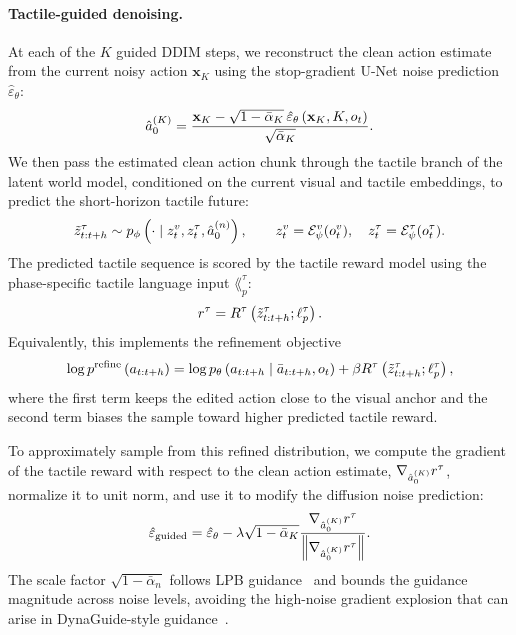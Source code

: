 \paragraph{Tactile-guided denoising.}
At each of the $K$ guided DDIM steps, we reconstruct the clean action estimate
from the current noisy action $\mathbf{x}_{K}$ using the stop-gradient U-Net
noise prediction $\hat{\varepsilon}_\theta$:
\begin{equation}
\hat{a}_{0}^{(K)}
=
\frac{
    \mathbf{x}_{K}
    -
    \sqrt{1-\bar\alpha_{K}}\,
    \hat{\varepsilon}_\theta
    \left(
        \mathbf{x}_{K}, K, o_t
    \right)
}{
    \sqrt{\bar\alpha_{K}}
}.
\label{eq:x0hat}
\end{equation}
We then pass the estimated clean action chunk through the tactile branch of the
latent world model, conditioned on the current visual and tactile embeddings, to
predict the short-horizon tactile future:
\begin{equation}
\tilde{z}^{\tau}_{t:t+h}
\sim
p_\phi
\left(
    \cdot
    \mid
    z^{v}_t,
    z^{\tau}_t,
    \hat{a}_{0}^{(n)}
\right),
\qquad
z^{v}_t=\mathcal{E}_\psi^{v}(o^v_t),
\quad
z^{\tau}_t=\mathcal{E}_\psi^{\tau}(o^\tau_t).
\label{eq:tactile_future_prediction}
\end{equation}
The predicted tactile sequence is scored by the tactile reward model using the
phase-specific tactile language input $\lang_p^\tau$:
\begin{equation}
r^\tau
=
R^\tau
\left(
    \tilde{z}^{\tau}_{t:t+h};
    \ell_p^\tau
\right).
\label{eq:tactile_reward_guidance}
\end{equation}
Equivalently, this implements the refinement objective
\begin{equation}
\log p^{\mathrm{refine}}
\left(
    a_{t:t+h}
\right)
=
\log p_\theta
\left(
    a_{t:t+h}
    \mid
    \bar{a}_{t:t+h}, o_t
\right)
+
\beta
R^\tau
\left(
    \tilde{z}^{\tau}_{t:t+h};
    \ell_p^\tau
\right),
\label{eq:refined_policy_distribution}
\end{equation}
where the first term keeps the edited action close to the visual anchor and the
second term biases the sample toward higher predicted tactile reward.

To approximately sample from this refined distribution, we compute the gradient
of the tactile reward with respect to the clean action estimate,
$\nabla_{\hat{a}_{0}^{(K)}} r^\tau$, normalize it to unit norm, and use it
to modify the diffusion noise prediction:
\begin{equation}
\hat{\varepsilon}_{\mathrm{guided}}
=
\hat{\varepsilon}_\theta
-
\lambda
\sqrt{1-\bar\alpha_K}
\frac{
    \nabla_{\hat{a}_{0}^{(K)}} r^\tau
}{
    \left\|
    \nabla_{\hat{a}_{0}^{(K)}} r^\tau
    \right\|
}.
\label{eq:guided_eps}
\end{equation}
The scale factor $\sqrt{1-\bar\alpha_n}$ follows LPB guidance~\cite{sun2026latent} and
bounds the guidance magnitude across noise levels, avoiding the high-noise
gradient explosion that can arise in DynaGuide-style guidance~\cite{du2025dynaguidesteeringdiffusionpolices}.

